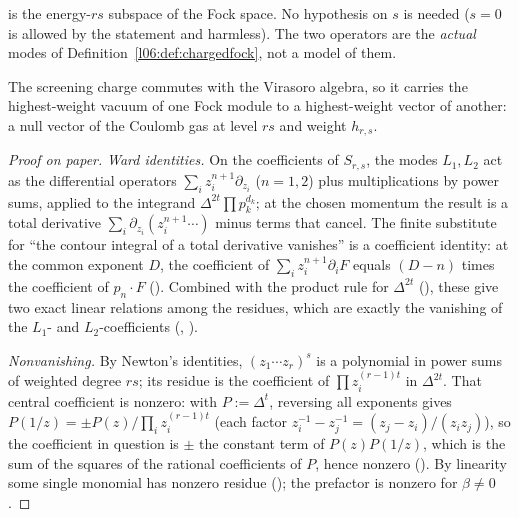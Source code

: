\begin{dictionary}
 is the energy-$rs$ subspace of the Fock space. No hypothesis on $s$ is needed
($s = 0$ is allowed by the statement and harmless). The two operators are the \emph{actual} modes
 of Definition~\ref{l06:def:chargedfock}, not a model of them.
\end{dictionary}

\begin{physics}
The screening charge commutes with the Virasoro algebra, so it carries the highest-weight vacuum of one
Fock module to a highest-weight vector of another: a null vector of the Coulomb gas at level $rs$ and
weight $h_{r,s}$.
\end{physics}

\begin{proof}[Proof on paper]
\emph{Ward identities.} On the coefficients of $S_{r,s}$, the modes $L_1,L_2$ act as the differential
operators $\sum_i z_i^{n+1}\partial_{z_i}$ ($n = 1,2$) plus multiplications by power sums, applied to the
integrand $\Delta^{2t}\prod p_k^{d_k}$; at the chosen momentum the result is a total derivative
$\sum_i\partial_{z_i}(z_i^{n+1}\cdots)$ minus terms that cancel. The finite substitute for ``the contour
integral of a total derivative vanishes'' is a coefficient identity: at the common exponent $D$, the
coefficient of
$\sum_iz_i^{n+1}\partial_iF$ equals $(D-n)$ times the coefficient of $p_n\cdot F$
(\allowbreak{}\allowbreak{}). Combined with the product rule for $\Delta^{2t}$
(\allowbreak{}\allowbreak{}), these give two exact linear relations among the residues,
which are exactly the vanishing of the $L_1$- and $L_2$-coefficients (\allowbreak{}\allowbreak{},
\allowbreak{}\allowbreak{}).

\emph{Nonvanishing.} By Newton's identities, $(z_1\cdots z_r)^s$ is a polynomial in power sums of weighted
degree $rs$; its residue is the coefficient of $\prod z_i^{(r-1)t}$ in $\Delta^{2t}$. That central
coefficient is nonzero: with $P := \Delta^t$, reversing all exponents gives
$P(1/z) = \pm P(z)/\prod_iz_i^{(r-1)t}$ (each factor $z_i^{-1}-z_j^{-1} = (z_j-z_i)/(z_iz_j)$), so the
coefficient in question is $\pm$ the constant term of $P(z)P(1/z)$, which is the sum of the squares of the
rational coefficients of $P$, hence nonzero (\allowbreak{}\allowbreak{}\allowbreak{}\allowbreak{}).
By linearity some single monomial has nonzero residue (\allowbreak{}\allowbreak{}); the prefactor is
nonzero for $\beta\ne0$.
\end{proof}

